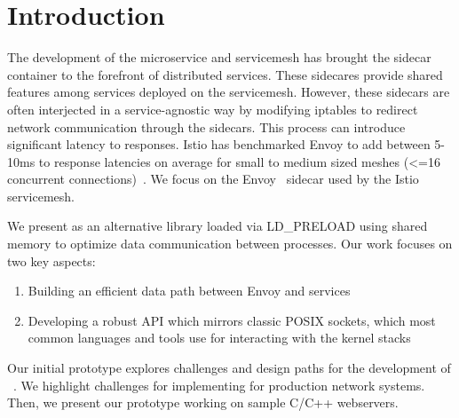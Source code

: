 \section{Introduction}
\label{sec:introduction}
The development of the microservice and servicemesh has brought the sidecar container to the forefront of distributed services.
These sidecares provide shared features among services deployed on the servicemesh.
However, these sidecars are often interjected in a service-agnostic way by modifying iptables to redirect network communication through the sidecars.
This process can introduce significant latency to responses.
Istio has benchmarked Envoy to add between 5-10ms to response latencies on average for small to medium sized meshes (<=16 concurrent connections)~\cite{envoy_perf}.
We focus on the Envoy~\cite{envoy} sidecar used by the Istio~\cite{istio} servicemesh.

We present \sysname as an alternative library loaded via LD\_PRELOAD using shared memory to optimize data communication between processes.
Our work focuses on two key aspects:
\begin{enumerate}
    \item Building an efficient data path between Envoy and services
    \item Developing a robust API which mirrors classic POSIX sockets, which most common languages and tools use for interacting with the kernel stacks
\end{enumerate}

Our initial prototype explores challenges and design paths for the development of \sysname~\cite{kmap_source}.
We highlight challenges for implementing \sysname for production network systems.
Then, we present our prototype working on sample C/C++ webservers.